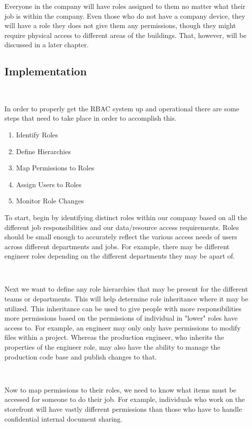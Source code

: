 \documentclass[12pt,a4paper]{report}
\begin{document}
Everyone in the company will have roles assigned to them no matter what their job is within the company.
Even those who do not have a company device, they will have a role they does not give them any permissions, though they might require physical access to different areas of the buildings. That, however, will be discussed in a later chapter.

\subsection{Implementation}
\

In order to properly get the RBAC system up and operational there are some steps that need to take place in order to accomplish this.
\begin{enumerate}
 \item Identify Roles
 \item Define Hierarchies
 \item Map Permissions to Roles
 \item Assign Users to Roles
 \item Monitor Role Changes
\end{enumerate}

To start, begin by identifying distinct roles within our company based on all the different job responsibilities and our data/resource access requirements.
Roles should be small enough to accurately reflect the various access needs of users across different departments and jobs.
For example, there may be different engineer roles depending on the different departments they may be apart of.

\

Next we want to define any role hierarchies that may be present for the different teams or departments. 
This will help determine role inheritance where it may be utilized.
This inheritance can be used to give people with more responsibilities more permissions based on the permissions of individual in "lower" roles have access to.
For example, an engineer may only only have permissions to modify files within a project.
Whereas the production engineer, who inherits the properties of the engineer role, may also have the ability to manage the production code base and publish changes to that.

\

Now to map permissions to their roles, we need to know what items must be accessed for someone to do their job.
For example, individuals who work on the storefront will have vastly different permissions than those who have to handle confidential internal document sharing.
\end{document}
